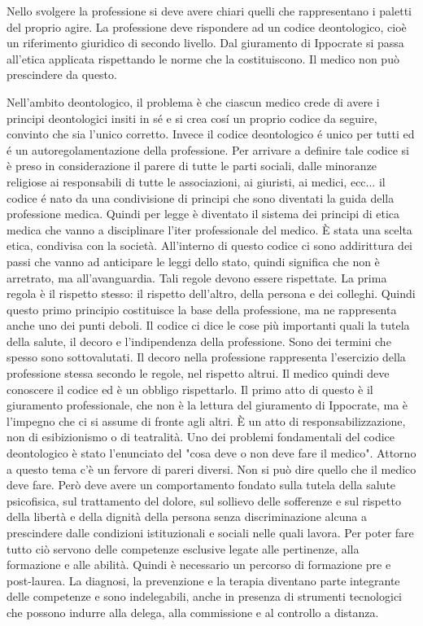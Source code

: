 \documentclass[]{article}
\begin{document}
Nello svolgere la professione si deve avere chiari quelli che
rappresentano i paletti del proprio agire. La professione deve
rispondere ad un codice deontologico, cioè un riferimento giuridico di
secondo livello. Dal giuramento di Ippocrate si passa all'etica
applicata rispettando le norme che la costituiscono. Il medico non può
prescindere da questo.

Nell'ambito deontologico, il problema è che ciascun medico crede di
avere i principi deontologici insiti in sé e si crea cosí un proprio
codice da seguire, convinto che sia l'unico corretto. Invece il codice
deontologico é unico per tutti ed é un autoregolamentazione della
professione. Per arrivare a definire tale codice si è preso in
considerazione il parere di tutte le parti sociali, dalle minoranze
religiose ai responsabili di tutte le associazioni, ai giuristi, ai
medici, ecc... il codice é nato da una condivisione di principi che sono
diventati la guida della professione medica. Quindi per legge è
diventato il sistema dei principi di etica medica che vanno a
disciplinare l'iter professionale del medico. È stata una scelta etica,
condivisa con la società. All'interno di questo codice ci sono
addirittura dei passi che vanno ad anticipare le leggi dello stato,
quindi significa che non è arretrato, ma all'avanguardia. Tali regole
devono essere rispettate. La prima regola è il rispetto stesso: il
rispetto dell'altro, della persona e dei colleghi. Quindi questo primo
principio costituisce la base della professione, ma ne rappresenta anche
uno dei punti deboli. Il codice ci dice le cose più importanti quali la
tutela della salute, il decoro e l'indipendenza della professione. Sono
dei termini che spesso sono sottovalutati. Il decoro nella professione
rappresenta l'esercizio della professione stessa secondo le regole, nel
rispetto altrui. Il medico quindi deve conoscere il codice ed è un
obbligo rispettarlo. Il primo atto di questo è il giuramento
professionale, che non è la lettura del giuramento di Ippocrate, ma è
l'impegno che ci si assume di fronte agli altri. È un atto di
responsabilizzazione, non di esibizionismo o di teatralità. Uno dei
problemi fondamentali del codice deontologico è stato l'enunciato del
"cosa deve o non deve fare il medico". Attorno a questo tema c'è un
fervore di pareri diversi. Non si può dire quello che il medico deve
fare. Però deve avere un comportamento fondato sulla tutela della salute
psicofisica, sul trattamento del dolore, sul sollievo delle sofferenze e
sul rispetto della libertà e della dignità della persona senza
discriminazione alcuna a prescindere dalle condizioni istituzionali e
sociali nelle quali lavora. Per poter fare tutto ciò servono delle
competenze esclusive legate alle pertinenze, alla formazione e alle
abilità. Quindi è necessario un percorso di formazione pre e
post-laurea. La diagnosi, la prevenzione e la terapia diventano parte
integrante delle competenze e sono indelegabili, anche in presenza di
strumenti tecnologici che possono indurre alla delega, alla commissione
e al controllo a distanza.
\end{document}
